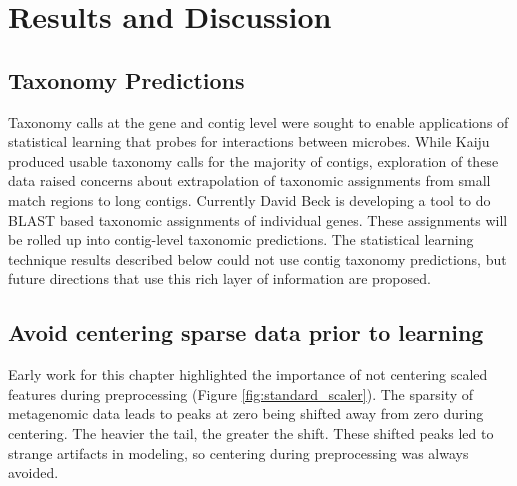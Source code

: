 \section{Results and Discussion}

\subsection{Taxonomy Predictions}
\label{results:taxonomy}
Taxonomy calls at the gene and contig level were sought to enable applications of statistical learning that probes for interactions between microbes.
While Kaiju produced usable taxonomy calls for the majority of contigs, exploration of these data raised concerns about extrapolation of taxonomic assignments from small match regions to long contigs. %
Currently David Beck is developing a tool to do BLAST based taxonomic assignments of individual genes.
These assignments will be rolled up into contig-level taxonomic predictions.
The statistical learning technique results described below could not use contig taxonomy predictions, but future directions that use this rich layer of information are proposed.

\subsection{Avoid centering sparse data prior to learning}
\label{sect:centering_sparse}
Early work for this chapter highlighted the importance of not centering scaled features during preprocessing (Figure \ref{fig:standard_scaler}).
The sparsity of metagenomic data leads to peaks at zero being shifted away from zero during centering. %
The heavier the tail, the greater the shift. %
These shifted peaks led to strange artifacts in modeling, so centering during preprocessing was always avoided.

